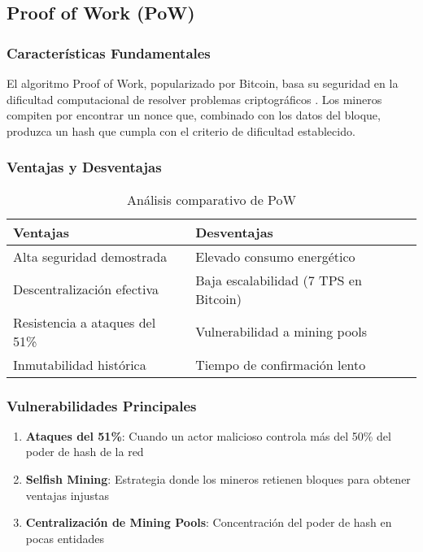 \subsection{Proof of Work (PoW)}

\subsubsection{Características Fundamentales}

El algoritmo Proof of Work, popularizado por Bitcoin, basa su seguridad en la dificultad computacional de resolver problemas criptográficos \cite{nakamoto2008bitcoin}. Los mineros compiten por encontrar un nonce que, combinado con los datos del bloque, produzca un hash que cumpla con el criterio de dificultad establecido.

\subsubsection{Ventajas y Desventajas}

\begin{table}[h]
\centering
\begin{tabular}{|p{6cm}|p{6cm}|}
\hline
\textbf{Ventajas} & \textbf{Desventajas} \\
\hline
Alta seguridad demostrada & Elevado consumo energético \\
Descentralización efectiva & Baja escalabilidad (7 TPS en Bitcoin) \\
Resistencia a ataques del 51\% & Vulnerabilidad a mining pools \\
Inmutabilidad histórica & Tiempo de confirmación lento \\
\hline
\end{tabular}
\caption{Análisis comparativo de PoW}
\label{tab:pow-comparison}
\end{table}

\subsubsection{Vulnerabilidades Principales}

\begin{enumerate}
    \item \textbf{Ataques del 51\%}: Cuando un actor malicioso controla más del 50\% del poder de hash de la red
    \item \textbf{Selfish Mining}: Estrategia donde los mineros retienen bloques para obtener ventajas injustas
    \item \textbf{Centralización de Mining Pools}: Concentración del poder de hash en pocas entidades
\end{enumerate}

